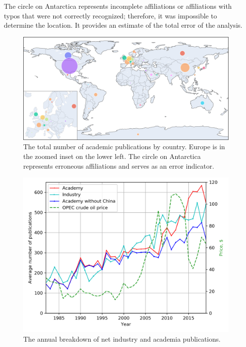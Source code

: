 \documentclass[geosciences,article,submit,moreauthors,pdftex]{Definitions/mdpi}
\begin{document}
The circle on Antarctica represents incomplete affiliations or affiliations with typos that were not correctly recognized; therefore, it was impossible to determine the location. It provides an estimate of the total error of the analysis.

\begin{figure}[ht!]
\centering
\includegraphics[width=\textwidth]{plottly_world3.png}
\caption{The total number of academic publications by country. Europe is in the zoomed inset on the lower left. The circle on Antarctica represents erroneous affiliations and serves as an error indicator.}
\label{acad_world}
\end{figure}

\begin{figure}[ht!]
\centering
\includegraphics[scale=0.7]{acad_indus_plot.png}
\caption{The annual breakdown of net industry and academia publications.}
\label{acad_vs_ind}
\end{figure}
\end{document}

